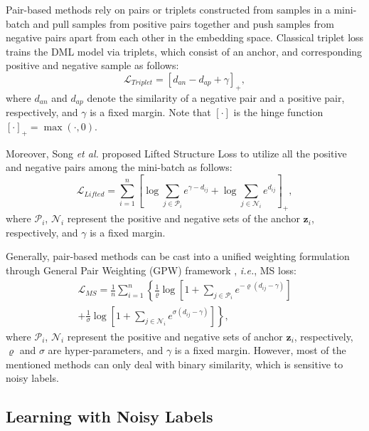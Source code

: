 \documentclass[lettersize,journal]{IEEEtran}
\begin{document}
Pair-based methods rely on pairs or triplets constructed from samples in a mini-batch and  pull samples from  positive pairs together  and push samples from  negative
pairs apart from each other in the embedding space. Classical triplet loss \cite{hoffer2015deep} trains the DML model via triplets, which consist of an anchor, and corresponding positive and negative sample as follows:
\begin{equation}
	\mathcal{L}_{Triplet} = \left[ d_{an} - d_{ap} + \gamma\right]_{+},
\end{equation}
where $d_{an}$ and $d_{ap}$ denote the similarity of a negative pair and a  positive pair, respectively, and $\gamma$ is a fixed margin. Note that $\left[\cdot\right]$ is the hinge function $\left[\cdot\right]_{+} = \max(\cdot,0)$.

 Moreover, Song \textit{et al.} \cite{oh2016deep} proposed Lifted Structure Loss to utilize all the positive and negative pairs among the mini-batch as follows:
\begin{equation}
	\mathcal{L}_{Lifted} = \sum_{i = 1}^n \left[ \log \sum_{j \in \mathcal{P}_i} e^{\gamma- d_{ij}} + \log \sum_{j \in \mathcal{N}_i}e^{d_{ij}} \right]_{+},
\end{equation}
where $\mathcal{P}_i$, $\mathcal{N}_i$ represent the positive  and negative sets of the anchor $\mathbf{z}_i$, respectively, and $\gamma$ is a fixed margin.

Generally, pair-based methods can be
cast into a unified weighting formulation through General
Pair Weighting (GPW) framework \cite{wang2019multi}, \textit{i.e.}, MS loss:
\begin{equation}
	\begin{aligned}
		\mathcal{L}_{MS} = \frac{1}{n} \sum_{i = 1}^{n}  \left\lbrace \frac{1}{\varrho} \log \left[ 1 + \sum_{j \in \mathcal{P}_i} e^{-\varrho(d_{ij}-\gamma)} \right]  \right. \\
		+ \left.\frac{1}{\sigma} \log \left[ 1 + \sum_{j \in \mathcal{N}_i} e^{\sigma(d_{ij}- \gamma)} \right]\right\rbrace,
	\end{aligned}
\end{equation}
where $\mathcal{P}_i$, $\mathcal{N}_i$ represent the positive  and negative sets of anchor $\mathbf{z}_i$, respectively,  $\varrho$ and  $\sigma$ are hyper-parameters, and $\gamma$ is a fixed margin.
However, most of the mentioned
methods can only deal with binary similarity, which is sensitive to noisy labels.

\subsection{Learning with Noisy Labels}
\end{document}
